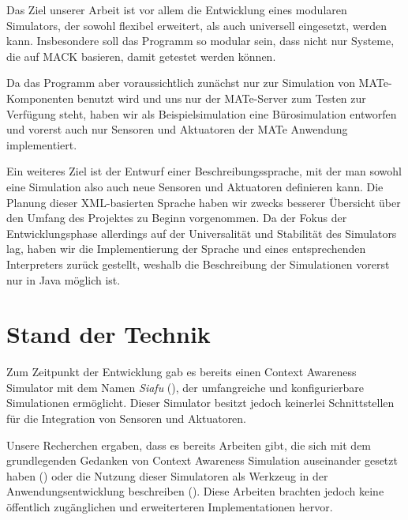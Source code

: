 Das Ziel unserer Arbeit ist vor allem die Entwicklung eines modularen Simulators, der sowohl flexibel erweitert, als auch universell eingesetzt, werden kann. Insbesondere soll das Programm so modular sein, dass nicht nur Systeme, die auf MACK basieren, damit getestet werden können.

Da das Programm aber voraussichtlich zunächst nur zur Simulation von MATe-Komponenten benutzt wird und uns nur der MATe-Server zum Testen zur Verfügung steht, haben wir als Beispielsimulation eine Bürosimulation entworfen und vorerst auch nur Sensoren und Aktuatoren der MATe Anwendung implementiert.

Ein weiteres Ziel ist der Entwurf einer Beschreibungssprache, mit der man sowohl eine Simulation also auch neue Sensoren und Aktuatoren definieren kann. Die Planung dieser XML-basierten Sprache haben wir zwecks besserer Übersicht über den Umfang des Projektes zu Beginn vorgenommen. Da der Fokus der Entwicklungsphase allerdings auf der Universalität und Stabilität des Simulators lag, haben wir die Implementierung der Sprache und eines entsprechenden Interpreters zurück gestellt, weshalb die Beschreibung der Simulationen vorerst nur in Java möglich ist.

\section{Stand der Technik}\label{sec:state_of_art}


Zum Zeitpunkt der Entwicklung gab es bereits einen Context Awareness Simulator mit dem Namen \emph{Siafu} (\cite{MartinMobiQuitous2006}), der umfangreiche und konfigurierbare Simulationen ermöglicht. Dieser Simulator besitzt jedoch keinerlei Schnittstellen für die Integration von Sensoren und Aktuatoren. 

Unsere Recherchen ergaben, dass es bereits Arbeiten gibt, die sich mit dem grundlegenden Gedanken von Context Awareness Simulation auseinander gesetzt haben (\cite{home-simulator}) oder die Nutzung dieser Simulatoren als Werkzeug in der Anwendungsentwicklung beschreiben (\cite{context-awareness-sim}). Diese Arbeiten brachten jedoch keine öffentlich zugänglichen und erweiterteren Implementationen hervor. 

